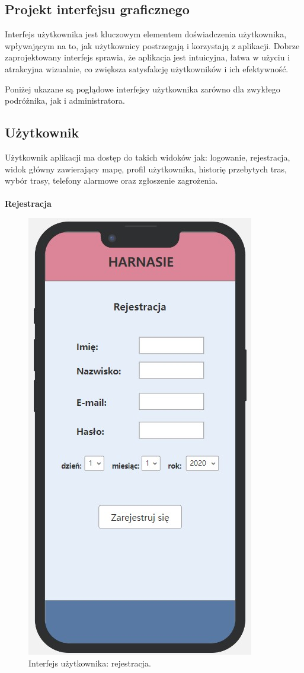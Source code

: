     \subsection{Projekt interfejsu graficznego}
    Interfejs użytkownika jest kluczowym elementem doświadczenia użytkownika, wpływającym na to, jak użytkownicy postrzegają i korzystają z aplikacji. Dobrze zaprojektowany interfejs sprawia, że aplikacja jest intuicyjna, łatwa w użyciu i atrakcyjna wizualnie, co zwiększa satysfakcję użytkowników i ich efektywność.

    Poniżej ukazane są poglądowe interfejsy użytkownika zarówno dla zwykłego podróżnika, jak i administratora.
    
    \subsection*{Użytkownik}
    Użytkownik aplikacji ma dostęp do takich widoków jak: logowanie, rejestracja, widok główny zawierający mapę, profil użytkownika, historię przebytych tras, wybór trasy, telefony alarmowe oraz zgłoszenie zagrożenia. \\
    \\
    \textbf{Rejestracja} 
     \begin{figure}[H]
        \centering
        \includegraphics[scale=0.5]{img/interfejsy/if_rejestracja.jpg}
        \caption{Interfejs użytkownika: rejestracja.}
        \label{interfejs:rejestracja}
    \end{figure}
